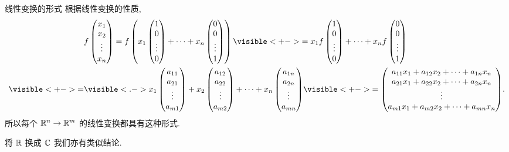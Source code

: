 \begin{frame}{线性变换的形式\noexer}
	\onslide<+->
	根据线性变换的性质,
	\begin{align*}
		&f\begin{pmatrix}
			x_1\\x_2\\\vdots\\x_n
		\end{pmatrix}
		=f\left(x_1\begin{pmatrix}
			1\\0\\\vdots\\0
		\end{pmatrix}+\dots+x_n\begin{pmatrix}
			0\\0\\\vdots\\1
		\end{pmatrix}\right)
		\visible<+->{=x_1f\begin{pmatrix}
			1\\0\\\vdots\\0
		\end{pmatrix}+\dots+x_nf\begin{pmatrix}
			0\\0\\\vdots\\1
		\end{pmatrix}}\\
		\visible<+->{=}&\visible<.->{x_1\begin{pmatrix}
			a_{11}\\a_{21}\\\vdots\\a_{m1}
		\end{pmatrix}+x_2\begin{pmatrix}
			a_{12}\\a_{22}\\\vdots\\a_{m2}
		\end{pmatrix}+\dots+x_n\begin{pmatrix}
			a_{1n}\\a_{2n}\\\vdots\\a_{mn}
		\end{pmatrix}}
		\visible<+->{=\begin{pmatrix}
			a_{11}x_1+a_{12}x_2+\cdots+a_{1n}x_n\\
			a_{21}x_1+a_{22}x_2+\cdots+a_{2n}x_n\\
			\vvdots\\
			a_{m1}x_1+a_{m2}x_2+\cdots+a_{mn}x_n
		\end{pmatrix}}.
	\end{align*}
	\onslide<+->
	所以每个 ${\mathbb{R}}^n\to{\mathbb{R}}^m$ 的线性变换都具有这种形式.

	\onslide<+->
	将 ${\mathbb{R}}$ 换成 ${\mathbb{C}}$ 我们亦有类似结论.
\end{frame}


